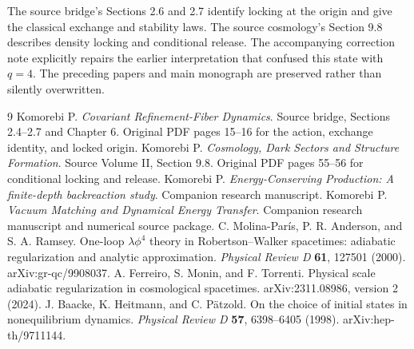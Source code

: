 \documentclass[11pt]{article}
\theoremstyle{definition}\newtheorem{definition}[theorem]{Definition}
\begin{document}
The source bridge's Sections 2.6 and 2.7 identify locking at the origin and give the classical exchange and stability laws. The source cosmology's Section 9.8 describes density locking and conditional release. The accompanying correction note explicitly repairs the earlier interpretation that confused this state with $q=4$. The preceding papers and main monograph are preserved rather than silently overwritten.

\begin{thebibliography}{9}\small
{} Komorebi P. \emph{Covariant Refinement-Fiber Dynamics}. Source bridge, Sections 2.4--2.7 and Chapter 6. Original PDF pages 15--16 for the action, exchange identity, and locked origin.
 Komorebi P. \emph{Cosmology, Dark Sectors and Structure Formation}. Source Volume II, Section 9.8. Original PDF pages 55--56 for conditional locking and release.
 Komorebi P. \emph{Energy-Conserving Production: A finite-depth backreaction study}. Companion research manuscript.
 Komorebi P. \emph{Vacuum Matching and Dynamical Energy Transfer}. Companion research manuscript and numerical source package.
 C. Molina-Par\'is, P. R. Anderson, and S. A. Ramsey. One-loop $\lambda\phi^4$ theory in Robertson--Walker spacetimes: adiabatic regularization and analytic approximation. \emph{Physical Review D} \textbf{61}, 127501 (2000). arXiv:gr-qc/9908037.
 A. Ferreiro, S. Monin, and F. Torrenti. Physical scale adiabatic regularization in cosmological spacetimes. arXiv:2311.08986, version 2 (2024).
 J. Baacke, K. Heitmann, and C. P\"atzold. On the choice of initial states in nonequilibrium dynamics. \emph{Physical Review D} \textbf{57}, 6398--6405 (1998). arXiv:hep-th/9711144.
\end{thebibliography}
\end{document}
